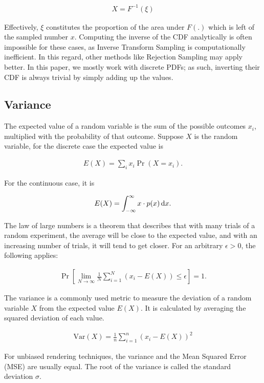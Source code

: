 \begin{align}
 X = F^{-1}(\xi)
\end{align}

Effectively, $\xi$ constitutes the proportion of the area under $F(.)$ which is left of the sampled number $x$. Computing the inverse of the CDF analytically is often impossible for these cases, as Inverse Transform Sampling is computationally inefficient. In this regard, other methods like Rejection Sampling may apply better. In this paper, we mostly work with discrete PDFs; as such, inverting their CDF is always trivial by simply adding up the values.

\subsection{Variance}
\label{sec:var}
The expected value of a random variable is the sum of the possible outcomes $x_i$, multiplied with the probability of that outcome. Suppose $X$ is the random variable, for the discrete case the expected value is

\begin{align}
 E(X) = \sum_i x_i \Pr(X = x_i).
\end{align}

For the continuous case, it is 

\begin{align}
 E(X) = \int_{-\infty}^{\infty} x \cdot p(x) \mathop{}\!\mathrm{d} x.
\end{align}

The law of large numbers is a theorem that describes that with many trials of a random experiment, the average will be close to the expected value, and with an increasing number of trials, it will tend to get closer. For an arbitrary $\epsilon > 0$, the following applies:

\begin{align}
 \Pr\left[ \lim_{N\rightarrow \infty} \frac{1}{N} \sum_{i=1}^N (x_i - E(X)) \leq \epsilon \right] = 1.
\end{align}

The variance is a commonly used metric to measure the deviation of a random variable $X$ from the expected value $E(X)$. It is calculated by averaging the squared deviation of each value.

\begin{align}
 \text{Var}(X) = \frac{1}{n} \sum_{i=1}^{n}(x_i - E(X))^2
\end{align}

For unbiased rendering techniques, the variance and the Mean Squared Error (MSE) are usually equal. The root of the variance is called the standard deviation $\sigma$.

